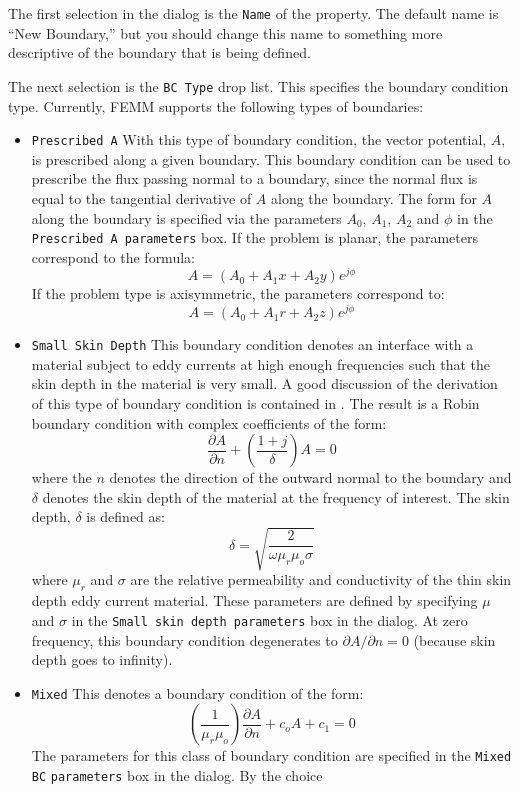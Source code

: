 \documentclass[12pt]{report}
\newcommand{\be}{\begin{equation}}
\newcommand{\ee}{\end{equation}}
\begin{document}
The first selection in the dialog is the {\tt Name} of the
property.  The default name is ``New Boundary,'' but you should
change this name to something more descriptive of the boundary that
is being defined.

The next selection is the {\tt BC Type} drop list.  This specifies
the boundary condition type.  Currently, FEMM supports the
following types of boundaries:
\begin{itemize}
\item {\tt Prescribed A}
With this type of boundary condition, the vector potential, $A$, is
prescribed along a given boundary.  This boundary condition can be
used to prescribe the flux passing normal to a boundary, since the
normal flux is equal to the tangential derivative of $A$ along the
boundary.  The form for $A$ along the boundary is specified via the
parameters $A_0$, $A_1$, $A_2$ and $\phi$ in the
{\tt Prescribed A parameters} box.  If the problem is planar, the
parameters correspond to the formula:
\be A=(A_0 + A_1 x + A_2 y) e^{j \phi} \ee
If the problem type is axisymmetric, the parameters correspond to:
\be A=(A_0 + A_1 r + A_2 z) e^{j \phi} \ee
\item {\tt Small Skin Depth}
This boundary condition denotes an interface with a material
subject to eddy currents at high enough frequencies such that the
skin depth in the material is very small.  A good discussion of the
derivation of this type of boundary condition is contained in
\cite{Hoole}.  The result is a Robin boundary condition with
complex coefficients of the form:
\be \frac{\partial A}{\partial n} + \left( \frac{1+j}{\delta} \right) A = 0 \ee
where the $n$ denotes the direction of the outward normal to the
boundary and $\delta$ denotes the skin depth of the material at the
frequency of interest.  The skin depth, $\delta$ is defined as:
\be \delta = \sqrt{\frac{2}{\omega \mu_r \mu_o \sigma}} \ee
where $\mu_r$ and $\sigma$ are the relative permeability and
conductivity of the thin skin depth eddy current material.  These
parameters are defined by specifying $\mu$ and $\sigma$ in
the {\tt Small skin depth parameters} box in the dialog.  At zero
frequency, this boundary condition degenerates to $\partial
A/\partial n=0$ (because skin depth goes to infinity).
\item {\tt Mixed}
This denotes a boundary condition of the form:
\be \left( \frac{1}{\mu_r \mu_o} \right) \frac{\partial A}{\partial n}
 + c_o A + c_1 = 0 \ee
The parameters for this class of boundary condition are specified
in the {\tt Mixed} {\tt BC} {\tt parameters} box in the dialog. By the choice

\end{itemize}
\end{document}

